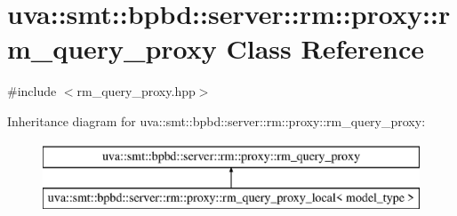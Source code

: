 \hypertarget{classuva_1_1smt_1_1bpbd_1_1server_1_1rm_1_1proxy_1_1rm__query__proxy}{}\section{uva\+:\+:smt\+:\+:bpbd\+:\+:server\+:\+:rm\+:\+:proxy\+:\+:rm\+\_\+query\+\_\+proxy Class Reference}
\label{classuva_1_1smt_1_1bpbd_1_1server_1_1rm_1_1proxy_1_1rm__query__proxy}


{\ttfamily \#include $<$rm\+\_\+query\+\_\+proxy.\+hpp$>$}

Inheritance diagram for uva\+:\+:smt\+:\+:bpbd\+:\+:server\+:\+:rm\+:\+:proxy\+:\+:rm\+\_\+query\+\_\+proxy\+:\begin{figure}[H]
\begin{center}
\leavevmode
\includegraphics[height=2.000000cm]{classuva_1_1smt_1_1bpbd_1_1server_1_1rm_1_1proxy_1_1rm__query__proxy}
\end{center}
\end{figure}
